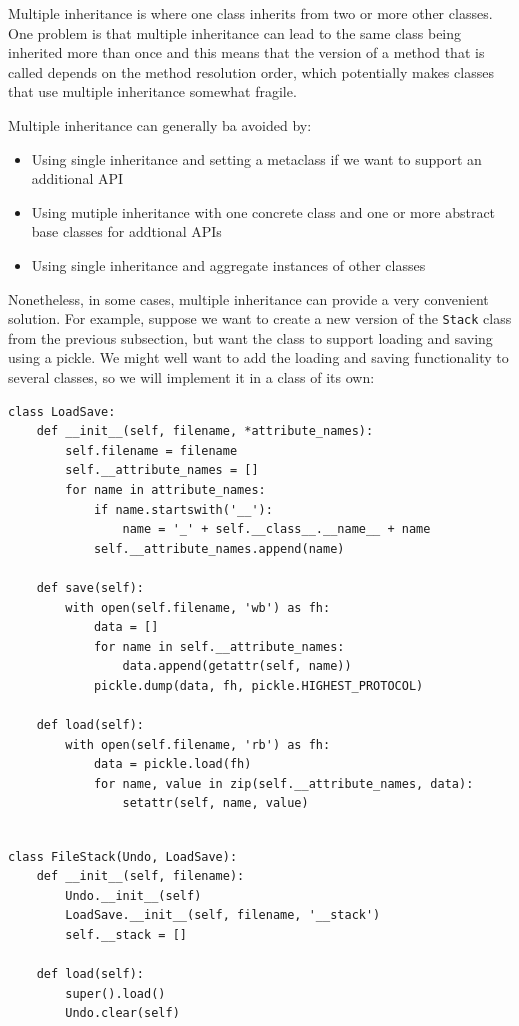 Multiple inheritance is where one class inherits from two or more other classes.
One problem is that multiple inheritance can lead to the same class being inherited more than once and this means that the version of a method that is called depends on the method resolution order,
which potentially makes classes that use multiple inheritance somewhat fragile.



Multiple inheritance can generally ba avoided by:
\begin{itemize}
\item Using single inheritance and setting a metaclass if we want to support an additional API
\item Using mutiple inheritance with one concrete class and one or more abstract base classes for addtional APIs
\item Using single inheritance and aggregate instances of other classes
\end{itemize}





Nonetheless, in some cases, multiple inheritance can provide a very convenient solution.
For example, suppose we want to create a new version of the \verb|Stack| class from the previous subsection, but want the class to support loading and saving using a pickle.
We might well want to add the loading and saving functionality to several classes, so we will implement it in a class of its own:
\begin{lstlisting}
class LoadSave:
    def __init__(self, filename, *attribute_names):
        self.filename = filename
        self.__attribute_names = []
        for name in attribute_names:
            if name.startswith('__'):
                name = '_' + self.__class__.__name__ + name
            self.__attribute_names.append(name)

    def save(self):
        with open(self.filename, 'wb') as fh:
            data = []
            for name in self.__attribute_names:
                data.append(getattr(self, name))
            pickle.dump(data, fh, pickle.HIGHEST_PROTOCOL)

    def load(self):
        with open(self.filename, 'rb') as fh:
            data = pickle.load(fh)
            for name, value in zip(self.__attribute_names, data):
                setattr(self, name, value)
  
\end{lstlisting}


\begin{lstlisting}
class FileStack(Undo, LoadSave):
    def __init__(self, filename):
        Undo.__init__(self)
        LoadSave.__init__(self, filename, '__stack')
        self.__stack = []

    def load(self):
        super().load()
        Undo.clear(self)
\end{lstlisting}

